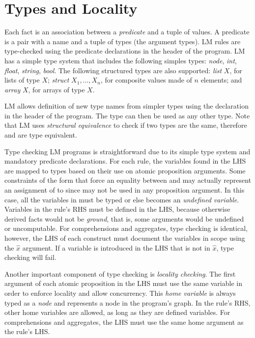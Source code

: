 \section{Types and Locality}

Each fact is an association between a \emph{predicate} and a tuple of values. A
predicate is a pair with a name and a tuple of types (the argument types). LM
rules are type-checked using the predicate declarations in the header of the
program. LM has a simple type system that includes the following simples types:
\emph{node}, \emph{int}, \emph{float}, \emph{string}, \emph{bool}. The following
structured types are also supported: \emph{list} $X$, for lists of type $X$;
\emph{struct} $X_1, \ldots, X_n$, for composite values made of $n$ elements; and
\emph{array} $X$, for arrays of type $X$.

LM allows definition of new type names from simpler types using the declaration
 in the header of the program. The type
 can then be used as any other type. Note that LM uses
\emph{structural equivalence} to check if two types are the same, therefore
 and  are type equivalent.

Type checking LM programs is straightforward due to its simple type system and
mandatory predicate declarations. For each rule, the variables found in the LHS
are mapped to types based on their use on atomic proposition arguments. Some
constraints of the form  that force an equality between
 and  may actually represent an assignment of
 to  since  may not be used in any proposition
argument. In this case, all the variables in  must be typed or
else  becomes an \emph{undefined variable}. Variables in the rule's RHS
must be defined in the LHS, because otherwise derived facts would not be
\emph{ground}, that is, some arguments would be undefined or uncomputable.  For
comprehensions and aggregates, type checking is identical, however, the LHS of
each construct must document the variables in scope using the $\hat{x}$
argument. If a variable is introduced in the LHS that is not in $\hat{x}$, type
checking will fail.

Another important component of type checking is \emph{locality checking}. The
first argument of each atomic proposition in the LHS must use the same variable
in order to enforce locality and allow concurrency. This \emph{home variable} is
always typed as a \emph{node} and represents a node in the program's graph. In
the rule's RHS, other home variables are allowed, as long as they are defined
variables. For comprehensions and aggregates, the LHS must use the same home
argument as the rule's LHS.

